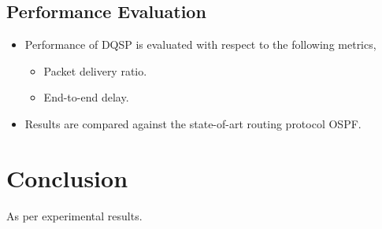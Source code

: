 \subsection{Performance Evaluation}
\begin{itemize}
\item {Performance of DQSP is evaluated with respect to the following metrics,}
\begin{itemize}
\item {Packet delivery ratio.}
\item{End-to-end delay.}
\end{itemize}
\item Results are compared against the state-of-art routing protocol OSPF.
\end{itemize}


\section{Conclusion}
As per experimental results.
